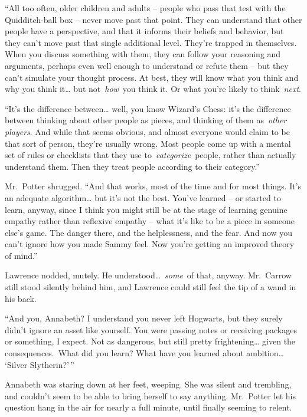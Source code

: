 ``All too often, older children and adults -- people who pass that test
with the Quidditch-ball box -- never move past that point. They can
understand that other people have a perspective, and that it informs
their beliefs and behavior, but they can't move past that single
additional level. They're trapped in themselves. When you discuss
something with them, they can follow your reasoning and arguments,
perhaps even well enough to understand or refute them -- but they can't
simulate your thought process. At best, they will know what you think
and why you think it\ldots{} but not~\emph{how}~you think it. Or what
you're likely to think~\emph{next}.

``It's the difference between\ldots{} well, you know Wizard's Chess:
it's the difference between thinking about other people as pieces, and
thinking of them as~\emph{other players}. And while that seems obvious,
and almost everyone would claim to be that sort of person, they're
usually wrong. Most people come up with a mental set of rules or
checklists that they use to~\emph{categorize}~people, rather than
actually understand them. Then they treat people according to their
category.''

Mr.~Potter shrugged. ``And that works, most of the time and for most
things. It's an adequate algorithm\ldots{} but it's not the best. You've
learned -- or started to learn, anyway, since I think you might still be
at the stage of learning genuine empathy rather than reflexive empathy
-- what it's like to be a piece in someone else's game. The danger
there, and the helplessness, and the fear. And now you can't ignore how
you made Sammy feel. Now you're getting an improved theory of mind.''

Lawrence nodded, mutely. He understood\ldots~\emph{some}~of that,
anyway. Mr.~Carrow still stood silently behind him, and Lawrence could
still feel the tip of a wand in his back.

``And you, Annabeth? I understand you never left Hogwarts, but they
surely didn't ignore an asset like yourself. You were passing notes or
receiving packages or something, I expect. Not as dangerous, but still
pretty frightening\ldots{} given the consequences.~What did you learn?
What have you learned about ambition\ldots{} `Silver Slytherin?'\,''

Annabeth was staring down at her feet, weeping. She was silent and
trembling, and couldn't seem to be able to bring herself to say
anything. Mr.~Potter let his question hang in the air for nearly a full
minute, until finally seeming to relent.

